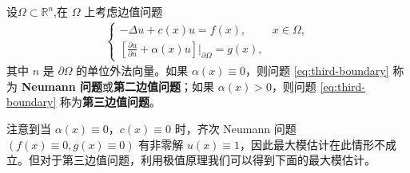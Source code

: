 \documentclass[../../main.tex]{subfiles}%
\begin{document}
\begin{definition}
设$\Omega\subset \mathbb{R}^n$,在 $\Omega$ 上考虑边值问题
\begin{align}
\begin{cases}
-\Delta u + c(x)u = f(x), & x\in\Omega, \\
\left[\frac{\partial u}{\partial n} + \alpha(x)u\right]\bigg|_{\partial\Omega} = g(x),
\end{cases} \label{eq:third-boundary}
\end{align}
其中 $n$ 是 $\partial\Omega$ 的单位外法向量。如果 $\alpha(x)\equiv 0$，则问题 \eqref{eq:third-boundary} 称为 \textbf{Neumann 问题}或\textbf{第二边值问题}；如果 $\alpha(x)>0$，则问题 \eqref{eq:third-boundary} 称为\textbf{第三边值问题}。
\end{definition}
\begin{remark}
注意到当 $\alpha(x)\equiv 0$，$c(x)\equiv 0$ 时，齐次 Neumann 问题 $(f(x)\equiv 0, g(x)\equiv 0)$ 有非零解 $u(x)\equiv 1$，因此最大模估计在此情形不成立。但对于第三边值问题，利用极值原理我们可以得到下面的最大模估计。
\end{remark}
\end{document}
